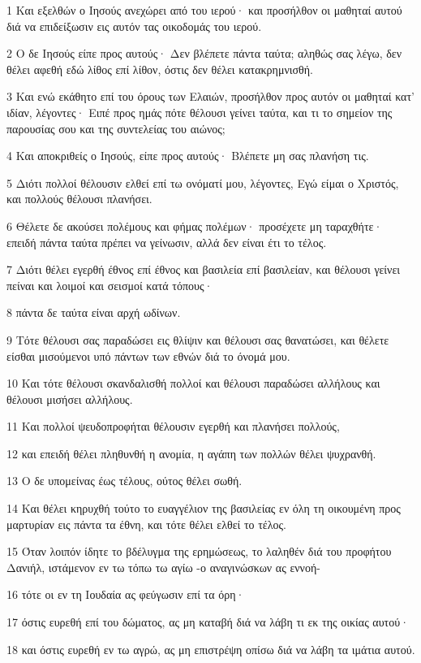 \par 1 Και εξελθών ο Ιησούς ανεχώρει από του ιερού· και προσήλθον οι μαθηταί αυτού διά να επιδείξωσιν εις αυτόν τας οικοδομάς του ιερού.
\par 2 Ο δε Ιησούς είπε προς αυτούς· Δεν βλέπετε πάντα ταύτα; αληθώς σας λέγω, δεν θέλει αφεθή εδώ λίθος επί λίθον, όστις δεν θέλει κατακρημνισθή.
\par 3 Και ενώ εκάθητο επί του όρους των Ελαιών, προσήλθον προς αυτόν οι μαθηταί κατ' ιδίαν, λέγοντες· Ειπέ προς ημάς πότε θέλουσι γείνει ταύτα, και τι το σημείον της παρουσίας σου και της συντελείας του αιώνος;
\par 4 Και αποκριθείς ο Ιησούς, είπε προς αυτούς· Βλέπετε μη σας πλανήση τις.
\par 5 Διότι πολλοί θέλουσιν ελθεί επί τω ονόματί μου, λέγοντες, Εγώ είμαι ο Χριστός, και πολλούς θέλουσι πλανήσει.
\par 6 Θέλετε δε ακούσει πολέμους και φήμας πολέμων· προσέχετε μη ταραχθήτε· επειδή πάντα ταύτα πρέπει να γείνωσιν, αλλά δεν είναι έτι το τέλος.
\par 7 Διότι θέλει εγερθή έθνος επί έθνος και βασιλεία επί βασιλείαν, και θέλουσι γείνει πείναι και λοιμοί και σεισμοί κατά τόπους·
\par 8 πάντα δε ταύτα είναι αρχή ωδίνων.
\par 9 Τότε θέλουσι σας παραδώσει εις θλίψιν και θέλουσι σας θανατώσει, και θέλετε είσθαι μισούμενοι υπό πάντων των εθνών διά το όνομά μου.
\par 10 Και τότε θέλουσι σκανδαλισθή πολλοί και θέλουσι παραδώσει αλλήλους και θέλουσι μισήσει αλλήλους.
\par 11 Και πολλοί ψευδοπροφήται θέλουσιν εγερθή και πλανήσει πολλούς,
\par 12 και επειδή θέλει πληθυνθή η ανομία, η αγάπη των πολλών θέλει ψυχρανθή.
\par 13 Ο δε υπομείνας έως τέλους, ούτος θέλει σωθή.
\par 14 Και θέλει κηρυχθή τούτο το ευαγγέλιον της βασιλείας εν όλη τη οικουμένη προς μαρτυρίαν εις πάντα τα έθνη, και τότε θέλει ελθεί το τέλος.
\par 15 Όταν λοιπόν ίδητε το βδέλυγμα της ερημώσεως, το λαληθέν διά του προφήτου Δανιήλ, ιστάμενον εν τω τόπω τω αγίω -ο αναγινώσκων ας εννοή-
\par 16 τότε οι εν τη Ιουδαία ας φεύγωσιν επί τα όρη·
\par 17 όστις ευρεθή επί του δώματος, ας μη καταβή διά να λάβη τι εκ της οικίας αυτού·
\par 18 και όστις ευρεθή εν τω αγρώ, ας μη επιστρέψη οπίσω διά να λάβη τα ιμάτια αυτού.
